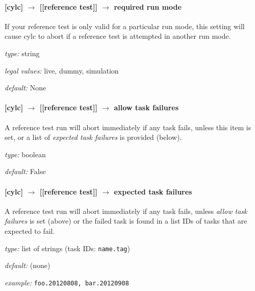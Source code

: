 \paragraph[required run mode]{[cylc] $\rightarrow$ [[reference test]] $\rightarrow$ required run mode}

If your reference test is only valid for a particular run mode, this
setting will cause cylc to abort if a reference test is attempted 
in another run mode.

\begin{myitemize}
    \item {\em type:} string
    \item {\em legal values:} live, dummy, simulation
    \item {\em default:} None
\end{myitemize}

\paragraph[allow task failures]{[cylc] $\rightarrow$ [[reference test]] $\rightarrow$ allow task failures}

A reference test run will abort immediately if any task fails, unless
this item is set, or a list of {\em expected task failures} is provided
(below).

\begin{myitemize}
    \item {\em type:} boolean
    \item {\em default:} False
\end{myitemize}

\paragraph[expected task failures]{[cylc] $\rightarrow$ [[reference test]] $\rightarrow$ expected task failures}

A reference test run will abort immediately if any task fails, unless
{\em allow task failures} is set (above) or the failed task is found 
in a list IDs of tasks that are expected to fail.

\begin{myitemize}
    \item {\em type:} list of strings (task IDs: \lstinline=name.tag=)
    \item {\em default:} (none)
    \item {\em example:} \lstinline=foo.20120808, bar.20120908=
\end{myitemize}

